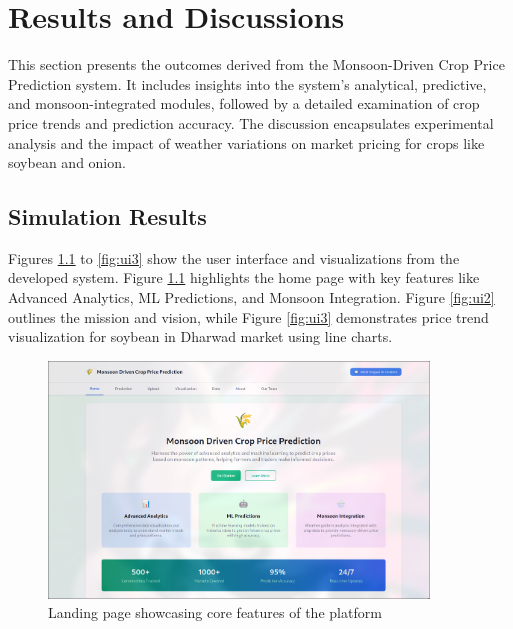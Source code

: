 
\chapter{Results and Discussions}
This section presents the outcomes derived from the Monsoon-Driven Crop Price Prediction system. It includes insights into the system's analytical, predictive, and monsoon-integrated modules, followed by a detailed examination of crop price trends and prediction accuracy. The discussion encapsulates experimental analysis and the impact of weather variations on market pricing for crops like soybean and onion.

\section{Simulation Results}
Figures \ref{fig:ui1} to \ref{fig:ui3} show the user interface and visualizations from the developed system. Figure \ref{fig:ui1} highlights the home page with key features like Advanced Analytics, ML Predictions, and Monsoon Integration. Figure \ref{fig:ui2} outlines the mission and vision, while Figure \ref{fig:ui3} demonstrates price trend visualization for soybean in Dharwad market using line charts.

\begin{figure}[H]
	\centering
	\includegraphics[width=0.9\textwidth]{Chapter5/WhatsApp Image 2025-07-04 at 22.18.36.jpeg}
	\caption{Landing page showcasing core features of the platform}
	\label{fig:ui1}
\end{figure}

